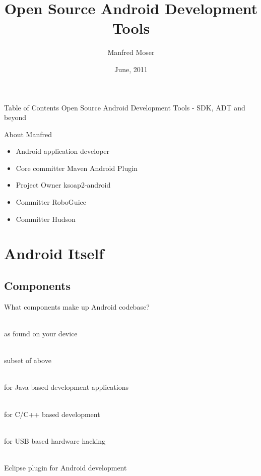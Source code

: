 \documentclass[aspectratio=169]{beamer}
\title{Open Source Android Development Tools}
\author{Manfred Moser}
\date{June, 2011}
\institute{simpligility technologies inc.}
\begin{document}
\begin{frame}
  \titlepage
\end{frame}

\begin{frame}{Table of Contents}
  Open Source Android Development Tools - SDK, ADT and beyond
  \setcounter{tocdepth}{1}
  \tableofcontents
\end{frame}

\begin{frame}{About Manfred}
  \begin{itemize}
    \item Android application developer
    \item Core committer Maven Android Plugin
    \item Project Owner ksoap2-android
    \item Committer RoboGuice
    \item Committer Hudson
  \end{itemize}

\end{frame}


\section{Android Itself}

  \subsection{Components}
    \begin{frame}{What components make up Android codebase?}
      \begin{description}
        \item<1->[Android Proper] \hfill \\ as found on your device
        \item<2->[Android Open Source Project AOSP] \hfill  \\ subset of above 
        \item<3->[Android Software Development Kit SDK] \hfill  \\ for Java based development applications
        \item<4->[Android Native Development Kit NDK] \hfill  \\ for C/C++ based development
        \item<5->[Android Open Accessory Development Kit ADK] \hfill \\ for USB based hardware hacking
        \item<6->[Android Development Toolkit ADT] \hfill  \\ Eclipse plugin for Android development  
      \end{description}
    \end{frame}
\end{document}
